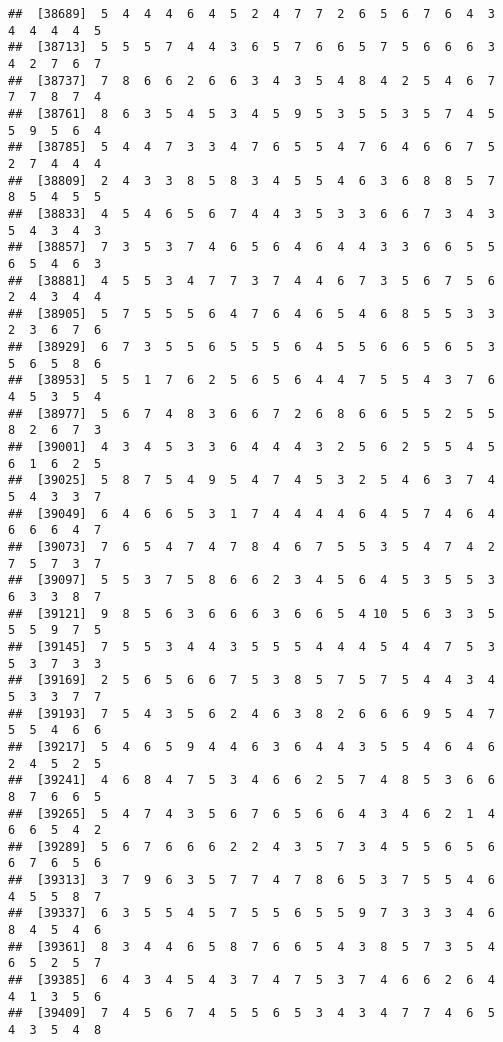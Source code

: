 \documentclass[
]{book}
\begin{document}
\begin{verbatim}
##  [38689]  5  4  4  4  6  4  5  2  4  7  7  2  6  5  6  7  6  4  3  4  4  4  4  5
##  [38713]  5  5  5  7  4  4  3  6  5  7  6  6  5  7  5  6  6  6  3  4  2  7  6  7
##  [38737]  7  8  6  6  2  6  6  3  4  3  5  4  8  4  2  5  4  6  7  7  7  8  7  4
##  [38761]  8  6  3  5  4  5  3  4  5  9  5  3  5  5  3  5  7  4  5  5  9  5  6  4
##  [38785]  5  4  4  7  3  3  4  7  6  5  5  4  7  6  4  6  6  7  5  2  7  4  4  4
##  [38809]  2  4  3  3  8  5  8  3  4  5  5  4  6  3  6  8  8  5  7  8  5  4  5  5
##  [38833]  4  5  4  6  5  6  7  4  4  3  5  3  3  6  6  7  3  4  3  5  4  3  4  3
##  [38857]  7  3  5  3  7  4  6  5  6  4  6  4  4  3  3  6  6  5  5  6  5  4  6  3
##  [38881]  4  5  5  3  4  7  7  3  7  4  4  6  7  3  5  6  7  5  6  2  4  3  4  4
##  [38905]  5  7  5  5  5  6  4  7  6  4  6  5  4  6  8  5  5  3  3  2  3  6  7  6
##  [38929]  6  7  3  5  5  6  5  5  5  6  4  5  5  6  6  5  6  5  3  5  6  5  8  6
##  [38953]  5  5  1  7  6  2  5  6  5  6  4  4  7  5  5  4  3  7  6  4  5  3  5  4
##  [38977]  5  6  7  4  8  3  6  6  7  2  6  8  6  6  5  5  2  5  5  8  2  6  7  3
##  [39001]  4  3  4  5  3  3  6  4  4  4  3  2  5  6  2  5  5  4  5  6  1  6  2  5
##  [39025]  5  8  7  5  4  9  5  4  7  4  5  3  2  5  4  6  3  7  4  5  4  3  3  7
##  [39049]  6  4  6  6  5  3  1  7  4  4  4  4  6  4  5  7  4  6  4  6  6  6  4  7
##  [39073]  7  6  5  4  7  4  7  8  4  6  7  5  5  3  5  4  7  4  2  7  5  7  3  7
##  [39097]  5  5  3  7  5  8  6  6  2  3  4  5  6  4  5  3  5  5  3  6  3  3  8  7
##  [39121]  9  8  5  6  3  6  6  6  3  6  6  5  4 10  5  6  3  3  5  5  5  9  7  5
##  [39145]  7  5  5  3  4  4  3  5  5  5  4  4  4  5  4  4  7  5  3  5  3  7  3  3
##  [39169]  2  5  6  5  6  6  7  5  3  8  5  7  5  7  5  4  4  3  4  5  3  3  7  7
##  [39193]  7  5  4  3  5  6  2  4  6  3  8  2  6  6  6  9  5  4  7  5  5  4  6  6
##  [39217]  5  4  6  5  9  4  4  6  3  6  4  4  3  5  5  4  6  4  6  2  4  5  2  5
##  [39241]  4  6  8  4  7  5  3  4  6  6  2  5  7  4  8  5  3  6  6  8  7  6  6  5
##  [39265]  5  4  7  4  3  5  6  7  6  5  6  6  4  3  4  6  2  1  4  6  6  5  4  2
##  [39289]  5  6  7  6  6  6  2  2  4  3  5  7  3  4  5  5  6  5  6  6  7  6  5  6
##  [39313]  3  7  9  6  3  5  7  7  4  7  8  6  5  3  7  5  5  4  6  4  5  5  8  7
##  [39337]  6  3  5  5  4  5  7  5  5  6  5  5  9  7  3  3  3  4  6  8  4  5  4  6
##  [39361]  8  3  4  4  6  5  8  7  6  6  5  4  3  8  5  7  3  5  4  6  5  2  5  7
##  [39385]  6  4  3  4  5  4  3  7  4  7  5  3  7  4  6  6  2  6  4  4  1  3  5  6
##  [39409]  7  4  5  6  7  4  5  5  6  5  3  4  3  4  7  7  4  6  5  4  3  5  4  8

\end{verbatim}
\end{document}
